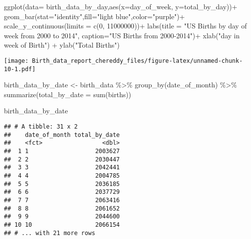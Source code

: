 \documentclass[
]{article}
\newenvironment{Shaded}{\begin{snugshade}}{\end{snugshade}}
\newcommand{\AttributeTok}[1]{\textcolor[rgb]{0.77,0.63,0.00}{#1}}
\newcommand{\DecValTok}[1]{\textcolor[rgb]{0.00,0.00,0.81}{#1}}
\newcommand{\FunctionTok}[1]{\textcolor[rgb]{0.00,0.00,0.00}{#1}}
\newcommand{\NormalTok}[1]{#1}
\newcommand{\OtherTok}[1]{\textcolor[rgb]{0.56,0.35,0.01}{#1}}
\newcommand{\SpecialCharTok}[1]{\textcolor[rgb]{0.00,0.00,0.00}{#1}}
\newcommand{\StringTok}[1]{\textcolor[rgb]{0.31,0.60,0.02}{#1}}
\begin{document}
\begin{Shaded}
\begin{Highlighting}[]
\FunctionTok{ggplot}\NormalTok{(}\AttributeTok{data=}\NormalTok{ birth\_data\_by\_day,}\FunctionTok{aes}\NormalTok{(}\AttributeTok{x=}\NormalTok{day\_of\_week, }\AttributeTok{y=}\NormalTok{total\_by\_day))}\SpecialCharTok{+}
  \FunctionTok{geom\_bar}\NormalTok{(}\AttributeTok{stat=}\StringTok{"identity"}\NormalTok{,}\AttributeTok{fill=}\StringTok{"light blue"}\NormalTok{,}\AttributeTok{color=}\StringTok{"purple"}\NormalTok{)}\SpecialCharTok{+}
  \FunctionTok{scale\_y\_continuous}\NormalTok{(}\AttributeTok{limits =} \FunctionTok{c}\NormalTok{(}\DecValTok{0}\NormalTok{, }\DecValTok{11000000}\NormalTok{))}\SpecialCharTok{+}
  \FunctionTok{labs}\NormalTok{(}\AttributeTok{title =} \StringTok{"US Births by day of week from 2000 to 2014"}\NormalTok{,}
       \AttributeTok{caption=}\StringTok{"US Births from 2000{-}2014"}\NormalTok{)}\SpecialCharTok{+}
  \FunctionTok{xlab}\NormalTok{(}\StringTok{"day in week of Birth"}\NormalTok{) }\SpecialCharTok{+}
  \FunctionTok{ylab}\NormalTok{(}\StringTok{"Total Births"}\NormalTok{)}
\end{Highlighting}
\end{Shaded}

\texttt{[image: Birth\_data\_report\_chereddy\_files/figure-latex/unnamed-chunk-10-1.pdf]}

\begin{Shaded}
\begin{Highlighting}[]
\NormalTok{birth\_data\_by\_date }\OtherTok{\textless{}{-}}\NormalTok{ birth\_data }\SpecialCharTok{\%\textgreater{}\%} 
  \FunctionTok{group\_by}\NormalTok{(date\_of\_month) }\SpecialCharTok{\%\textgreater{}\%} 
  \FunctionTok{summarize}\NormalTok{(}\AttributeTok{total\_by\_date =} \FunctionTok{sum}\NormalTok{(births))}

\NormalTok{birth\_data\_by\_date}
\end{Highlighting}
\end{Shaded}

\begin{verbatim}
## # A tibble: 31 x 2
##    date_of_month total_by_date
##    <fct>                 <dbl>
##  1 1                   2003627
##  2 2                   2030447
##  3 3                   2042441
##  4 4                   2004785
##  5 5                   2036185
##  6 6                   2037729
##  7 7                   2063416
##  8 8                   2061652
##  9 9                   2044600
## 10 10                  2066154
## # ... with 21 more rows
\end{verbatim}
\end{document}
